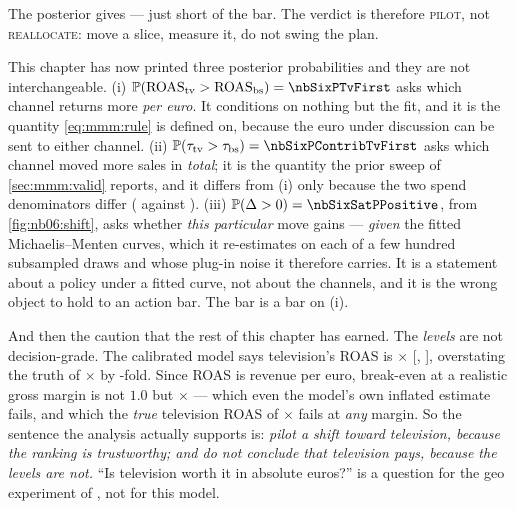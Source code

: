 The posterior gives \nbSixPTvFirst{} --- just short of the \nbSixActionBar{} bar. The verdict is
therefore \textsc{pilot}, not \textsc{reallocate}: move a slice, measure it, do not swing the plan.

\begin{remark}
This chapter has now printed three posterior probabilities and they are not interchangeable. (i)
$\Prob(\text{ROAS}_{\text{tv}} > \text{ROAS}_{\text{bs}}) = \nbSixPTvFirst$ asks which channel
returns more \emph{per euro}. It conditions on nothing but the fit, and it is the quantity
\cref{eq:mmm:rule} is defined on, because the euro under discussion can be sent to either channel.
(ii) $\Prob(\tau_{\text{tv}} > \tau_{\text{bs}}) = \nbSixPContribTvFirst$ asks which channel moved
more sales in \emph{total}; it is the quantity the prior sweep of \cref{sec:mmm:valid} reports, and
it differs from (i) only because the two spend denominators differ (\eur{\nbSixSpendTv} against
\eur{\nbSixSpendBs}). (iii) $\Prob(\Delta > 0) = \nbSixSatPPositive$, from \cref{fig:nb06:shift},
asks whether \emph{this particular} \pc{\nbSixShiftPct} move gains --- \emph{given} the fitted
Michaelis--Menten curves, which it re-estimates on each of a few hundred subsampled draws and whose
plug-in noise it therefore carries. It is a statement about a policy under a fitted curve, not about
the channels, and it is the wrong object to hold to an action bar. The bar is a bar on (i).
\end{remark}

And then the caution that the rest of this chapter has earned. The \emph{levels} are not
decision-grade. The calibrated model says television's ROAS is \nbSixCalRoasTv$\times$
[\nbSixCalRoasTvLo, \nbSixCalRoasTvHi], overstating the truth of \nbSixTrueRoasTv$\times$ by
\nbSixCalRoasTvOverTrue-fold. Since ROAS is revenue per euro, break-even at a realistic
\pc{\nbSixMarginThirty} gross margin is not $1.0$ but \nbSixBreakevenThirty$\times$ --- which even
the model's own inflated estimate fails, and which the \emph{true} television ROAS of
\nbSixTrueRoasTv$\times$ fails at \emph{any} margin. So the sentence the analysis actually
supports is: \emph{pilot a shift toward television, because the ranking is trustworthy; and do not
conclude that television pays, because the levels are not.} ``Is television worth it in absolute
euros?'' is a question for the geo experiment of , not for this model.



